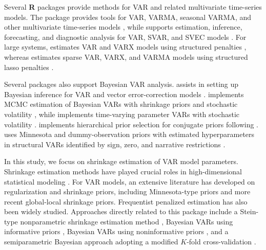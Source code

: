 Several \textbf{R} packages provide methods for VAR and related multivariate
time-series models. The  package provides tools for VAR,
VARMA, seasonal VARMA, and other multivariate time-series models
\citep{Tsay18}, while
 supports estimation, inference, forecasting, and
diagnostic analysis for VAR, SVAR, and SVEC models \citep{Pfaff18}. For
large systems,  estimates VAR and VARX models using
structured penalties \citep{Nicholson2026BigVAR}, whereas
 estimates sparse VAR, VARX, and VARMA models using
structured lasso penalties \citep{Wilms2023bigtime}.

Several packages also support Bayesian VAR analysis.
 assists in setting up Bayesian inference for VAR
and vector error-correction models \citep{Mohr2024bvartools}.
 implements MCMC estimation of Bayesian VARs with
shrinkage priors and stochastic volatility
\citep{Gruber2026bayesianVARs}, while  implements
time-varying parameter VARs with stochastic volatility
\citep{Primiceri2005timevarying, Krueger2015bvarsv}. 
implements hierarchical prior selection for conjugate priors following
\citeauthor{Giannone2015prior} \citetext{\citeyear{Giannone2015prior}; \citealp{KuschnigVashold2021BVAR}}.
 uses Minnesota and dummy-observation priors with
estimated hyperparameters in structural VARs identified by sign, zero,
and narrative restrictions \citep{WangWozniak2025bsvarSIGNs}.

In this study, we focus on shrinkage estimation of VAR model parameters.
Shrinkage estimation methods have played crucial roles in
high-dimensional statistical modeling
\citep{LedoitWolf2004shrinkcov, Bohm2009shrinkage, Fiecas2011aoas, Beltra2013shrinkageEEG}. For VAR
models, an extensive literature has developed on regularization and
shrinkage priors, including Minnesota-type priors and more recent
global-local shrinkage priors. Frequentist penalized estimation has
also been widely studied. Approaches directly related to this package include
a Stein-type nonparametric shrinkage estimation method \citep{Rhein07c},
Bayesian VARs using informative priors
\citep{Doan84, Litterman86, Banbura10, Koop10BayesianVAR}, Bayesian VARs
using noninformative priors \citep{Sun04, Ni05}, and a semiparametric
Bayesian approach adopting a modified \(K\)-fold cross-validation
\citep{LeeChoiKim2016}.

